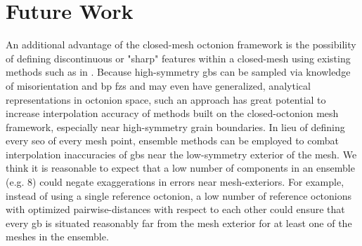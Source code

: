 \documentclass[preprint,12pt]{elsarticle}
\begin{document}
\section{Future Work} \label{sec:future}
An additional advantage of the closed-mesh octonion framework is the possibility of defining discontinuous or "sharp" features within a closed-mesh using existing methods such as in \cite{tianNonUniformSubdivisionSurfaces2020}. Because high-symmetry \glspl{gb} can be sampled via knowledge of misorientation and \gls{bp} \glspl{fz} and may even have generalized, analytical representations in octonion space, such an approach has great potential to increase interpolation accuracy of methods built on the closed-octonion mesh framework, especially near high-symmetry grain boundaries. In lieu of defining every \gls{seo} of every mesh point, ensemble methods can be employed to combat interpolation inaccuracies of \glspl{gb} near the low-symmetry exterior of the mesh. We think it is reasonable to expect that a low number of components in an ensemble (e.g. 8) could negate exaggerations in errors near mesh-exteriors. For example, instead of using a single reference octonion, a low number of reference octonions with optimized pairwise-distances \cite{dolanBenchmarkingOptimizationSoftware2004,ConstrainedElectrostaticNonlinear2020} with respect to each other could ensure that every \gls{gb} is situated reasonably far from the mesh exterior for at least one of the meshes in the ensemble.



\newpage
\printglossaries

\newpage


\end{document}
